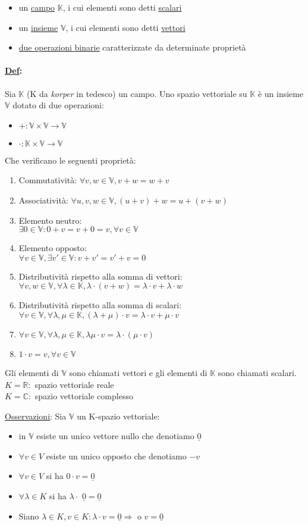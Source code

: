 \documentclass{article}
\newcommand{\ul}[1]{\underline{#1}}
\newcommand{\R}{\mathbb{R}}
\newcommand{\K}{\mathbb{K}}
\newcommand{\V}{\mathbb{V}}
\newcommand{\Def}[2]{\paragraph{\ul{Def}:}#1\\\hspace*{3em}\begin{minipage}{.8\textwidth}#2\end{minipage}}
\begin{document}
\begin{itemize}
	\item un \ul{campo} $\K$, i cui elementi sono detti \ul{scalari}
	\item un \ul{insieme} $\V$, i cui elementi sono detti \ul{vettori}
	\item \ul{due operazioni binarie} caratterizzate da determinate proprietà
\end{itemize}
\Def{Sia $\K$ (K da \textit{korper} in tedesco) un campo. Uno spazio vettoriale su $\K$ è un insieme $\V$ dotato di due operazioni:}{
	\begin{itemize}
		\item $+:\V\times\V\rightarrow\V$
		\item $\cdot:\K\times\V\rightarrow\V$
	\end{itemize}
	Che verificano le seguenti proprietà:
	\begin{enumerate}
		\item Commutatività: $\forall v,w\in\V, v+w=w+v$
		\item Associatività: $\forall u,v,w\in\V,(u+v)+w=u+(v+w)$
		\item Elemento neutro:\\$\exists0\in\V:0+v=v+0=v,\forall v\in\V$
		\item Elemento opposto:\\$\forall v\in\V,\exists v'\in\V:v+v'=v'+v=0$
		\item Distributività rispetto alla somma di vettori:\\$\forall v,w\in\V,\forall\lambda\in\K,\lambda\cdot(v+w)=\lambda\cdot v+\lambda\cdot w$
		\item Distributività rispetto alla somma di scalari:\\$\forall v\in\V,\forall\lambda,\mu\in\K,(\lambda+\mu)\cdot v=\lambda\cdot v+\mu\cdot v$
		\item $\forall v\in\V,\forall\lambda,\mu\in\K,\lambda\mu\cdot v=\lambda\cdot(\mu\cdot v)$
		\item $1\cdot v=v,\forall v\in\V$
	\end{enumerate}
	Gli elementi di $\V$ sono chiamati vettori e gli elementi di $\K$ sono chiamati scalari.\\
	$K=\R:$ spazio vettoriale reale\\
	$K=\mathbb{C}:$ spazio vettoriale complesso

	\ul{Osservazioni}: Sia $\V$ un K-spazio vettoriale:
	\begin{itemize}
		\item in $\V$ esiste un unico vettore nullo che denotiamo $\ul{0}$
		\item $\forall v\in V$ esiste un unico opposto che denotiamo $-v$
		\item $\forall v\in V$ si ha $0\cdot v=\ul{0}$
		\item $\forall\lambda\in K$ si ha $\lambda\cdot$ $\ul{0}=\ul{0}$
		\item Siano $\lambda\in K,v\in K:\lambda\cdot v=\ul{0}\Rightarrow$ o $v=\ul{0}$
	\end{itemize}
}
\end{document}
